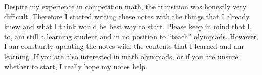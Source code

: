 \documentclass[../../main.tex]{subfiles}
\begin{document}
Despite my experience in competition math, the transition was
honestly very difficult. Therefore I started writing these notes
with the things that I already knew and what I think would be best
way to start. Please keep in mind that I, to, am still a learning
student and in no position to ``teach'' olympiads. However,
I am constantly updating the notes with the contents that I learned
and am learning. If you are also interested in math olympiads,
or if you are unsure whether to start, I really hope my notes help.








































\end{document}
